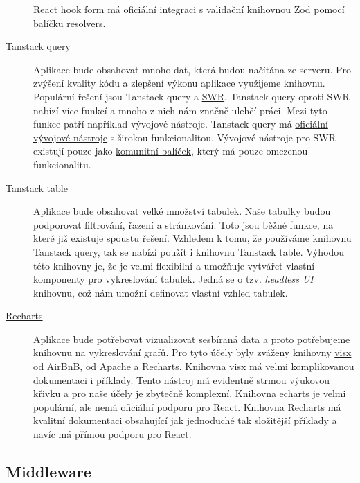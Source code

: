 \begin{description}
    React hook form má oficiální integraci s validační knihovnou Zod pomocí \href{https://github.com/react-hook-form/resolvers}{balíčku resolvers}.
    \item[\href{https://tanstack.com/query/latest}{Tanstack query}]
    Aplikace bude obsahovat mnoho dat, která budou načítána ze serveru.
    Pro zvýšení kvality kódu a zlepšení výkonu aplikace využijeme knihovnu.
    Populární řešení jsou Tanstack query a \href{https://swr.vercel.app/}{SWR}\@.
    Tanstack query oproti SWR nabízí více funkcí a mnoho z nich nám značně ulehčí práci.
    Mezi tyto funkce patří například vývojové nástroje.
    Tanstack query má \href{https://tanstack.com/query/v4/docs/react/devtools}{oficiální vývojové nástroje} s širokou funkcionalitou.
    Vývojové nástroje pro SWR existují pouze jako \href{https://github.com/koba04/swr-devtools}{komunitní balíček}, který má pouze omezenou funkcionalitu.
    \item[\href{https://tanstack.com/table/v8}{Tanstack table}]
    Aplikace bude obsahovat velké množství tabulek.
    Naše tabulky budou podporovat filtrování, řazení a stránkování.
    Toto jsou běžné funkce, na které již existuje spoustu řešení.
    Vzhledem k tomu, že používáme knihovnu Tanstack query, tak se nabízí použít i knihovnu Tanstack table.
    Výhodou této knihovny je, že je velmi flexibilní a umožňuje vytvářet vlastní komponenty pro vykreslování tabulek.
    Jedná se o tzv. \textit{headless UI} knihovnu, což nám umožní definovat vlastní vzhled tabulek.
    \item[\href{https://recharts.org/en-US/}{Recharts}]
    Aplikace bude potřebovat vizualizovat sesbíraná data a proto potřebujeme knihovnu na vykreslování grafů.
    Pro tyto účely byly zváženy knihovny \href{https://github.com/airbnb/visx}{visx} od AirBnB, \href{https://github.com/apache/echarts} od Apache a \href{https://github.com/recharts/recharts}{Recharts}.
    Knihovna visx má velmi komplikovanou dokumentaci i příklady.
    Tento nástroj má evidentně strmou výukovou křivku a pro naše účely je zbytečně komplexní.
    Knihovna echarts je velmi populární, ale nemá oficiální podporu pro React.
    Knihovna Recharts má kvalitní dokumentaci obsahující jak jednoduché tak složitější příklady a navíc má přímou podporu pro React.
\end{description}

\subsection{Middleware}\label{subsec:middleware}

